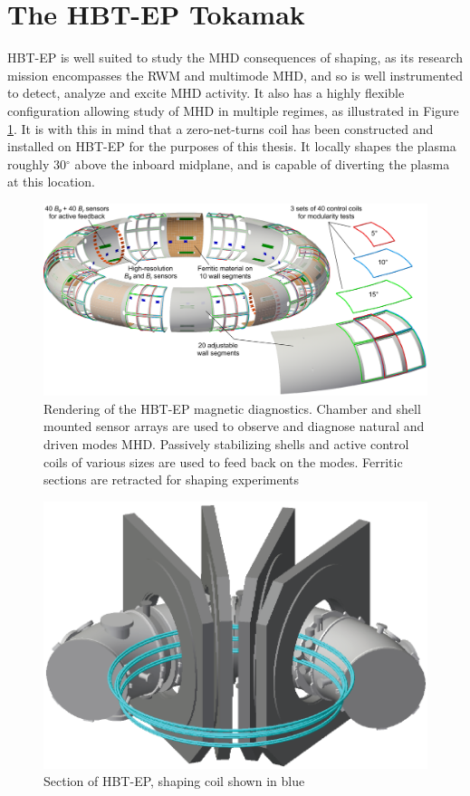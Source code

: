 \documentclass[aps,preprint,showpacs,superscriptaddress,groupedaddress]{revtex4}  %
\begin{document}
\section{The HBT-EP Tokamak}
	HBT-EP is well suited to study the MHD consequences of shaping, as its research mission encompasses the RWM and multimode MHD, and so is well instrumented to detect, analyze and excite MHD activity.  It also has a highly flexible configuration allowing study of MHD in multiple regimes, as illustrated in Figure \ref{schematic}. It is with this in mind that a zero-net-turns coil has been constructed and installed on HBT-EP for the purposes of this thesis.  It locally shapes the plasma roughly 30${^\circ}$ above the inboard midplane, and is capable of diverting the plasma at this location.
	\begin{figure}[htb]
	\centering
	\includegraphics[scale=.25]{../Plots/Plasma_with_sensors_FWall_concept_WithCCview.png}
	\caption{Rendering of the HBT-EP magnetic diagnostics.  Chamber and shell mounted sensor arrays are used to observe and diagnose natural and driven modes MHD.  Passively stabilizing shells and active control coils of various sizes are used to feed back on the modes.  Ferritic sections are retracted for shaping experiments}
	\label{schematic}
	\end{figure}
	
\begin{figure}[htb]
	\centering
\includegraphics[scale=.35]{../Plots/HBT_section_cropped.png}\caption{Section of HBT-EP, shaping coil shown in blue}
	\label{Coil_HBT_Section}
	\end{figure}
	
\end{document}
